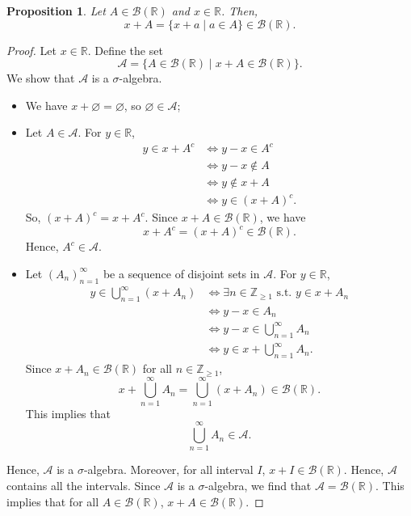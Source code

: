 \documentclass[a4paper, openany]{memoir}
\theoremstyle{definition}
\theoremstyle{plain}
\newtheorem{proposition}[definition]{Proposition}
\begin{document}
    \begin{proposition}
        Let $A \in \mathcal{B}(\mathbb{R})$ and $x \in \mathbb{R}$. Then,
        \[x + A = \{x + a \mid a \in A\} \in \mathcal{B}(\mathbb{R}).\]
    \end{proposition}
    \begin{proof}
        Let $x \in \mathbb{R}$. Define the set
        \[\mathcal{A} = \{A \in \mathcal{B}(\mathbb{R}) \mid x + A \in \mathcal{B}(\mathbb{R})\}.\]
        We show that $\mathcal{A}$ is a $\sigma$-algebra.
        \begin{itemize}
            \item We have $x + \varnothing = \varnothing$, so $\varnothing \in \mathcal{A}$;
            
            \item Let $A \in \mathcal{A}$. For $y \in \mathbb{R}$,
            \begin{align*}
                y \in x + A^c &\iff y - x \in A^c \\
                &\iff y - x \not\in A \\
                &\iff y \not\in x + A \\
                &\iff y \in (x + A)^c.
            \end{align*}
            So, $(x + A)^c = x + A^c$. Since $x + A \in \mathcal{B}(\mathbb{R})$, we have 
            \[x + A^c = (x + A)^c \in \mathcal{B}(\mathbb{R}).\]
            Hence, $A^c \in \mathcal{A}$.
            
            \item Let $(A_n)_{n=1}^\infty$ be a sequence of disjoint sets in $\mathcal{A}$. For $y \in \mathbb{R}$,
            \begin{align*}
                y \in \bigcup_{n=1}^\infty (x + A_n) &\iff \exists n \in \mathbb{Z}_{\geq 1} \textrm{ s.t. } y \in x + A_n \\
                &\iff y - x \in A_n \\
                &\iff y - x \in \bigcup_{n=1}^\infty A_n \\
                &\iff y \in x + \bigcup_{n=1}^\infty A_n.
            \end{align*}
            Since $x + A_n \in \mathcal{B}(\mathbb{R})$ for all $n \in \mathbb{Z}_{\geq 1}$,
            \[x + \bigcup_{n=1}^\infty A_n = \bigcup_{n=1}^\infty (x + A_n) \in \mathcal{B}(\mathbb{R}).\]
            This implies that
            \[\bigcup_{n=1}^\infty A_n \in \mathcal{A}.\]
        \end{itemize}
        Hence, $\mathcal{A}$ is a $\sigma$-algebra. Moreover, for all interval $I$, $x + I \in \mathcal{B}(\mathbb{R})$. Hence, $\mathcal{A}$ contains all the intervals. Since $\mathcal{A}$ is a $\sigma$-algebra, we find that $\mathcal{A} = \mathcal{B}(\mathbb{R})$. This implies that for all $A \in \mathcal{B}(\mathbb{R})$, $x + A \in \mathcal{B}(\mathbb{R})$.
    \end{proof}
    
\end{document}
